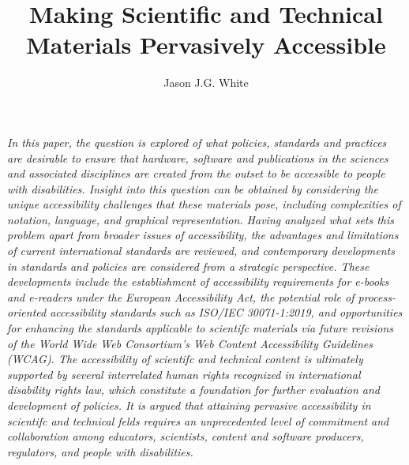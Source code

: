 \documentclass{sig-alternate} %
\makeatletter
\let\oldabstract\abstract
\let\oldendabstract\endabstract
\renewenvironment{abstract} %
{\renewenvironment{quotation}%
               {\list{}{\addtolength{\leftmargin}{1em} %
                        \listparindent 1.5em%
                        \itemindent    \listparindent%
                        \rightmargin   \leftmargin%
                        \parsep        \z@ \@plus\p@}%
                \item\relax}%
               {\endlist}%
\oldabstract}
{\oldendabstract}
\makeatother
\begin{document}
\title{Making Scientific and Technical Materials Pervasively Accessible}

\author[1]{\large \color{blue}Jason J.G. White}


\toappear{}
\maketitle
\begin{@twocolumnfalse} 
\begin{abstract}
\item 
 \textit {In this paper, the question is explored of what policies, standards and practices are desirable to ensure that hardware, software and publications in the sciences and associated disciplines are created from the outset to be accessible to people with disabilities. Insight into this question can be obtained by considering the unique accessibility challenges that these materials pose, including complexities of notation, language, and graphical representation. Having analyzed what sets this problem apart from broader issues of accessibility, the advantages and limitations of current international standards are reviewed, and contemporary developments in standards and policies are considered from a strategic perspective. These developments include the establishment of accessibility requirements for e-books and e-readers under the European Accessibility Act, the potential role of process-oriented accessibility standards such as ISO/IEC 30071-1:2019, and opportunities for enhancing the standards applicable to scientifc materials via future revisions of the World Wide Web Consortium's Web Content Accessibility Guidelines (WCAG). The accessibility of scientifc and technical content is ultimately supported by several interrelated human rights recognized in international disability rights law, which constitute a foundation for further evaluation and development of policies. It is argued that attaining pervasive accessibility in scientifc and technical felds requires an unprecedented level of commitment and collaboration among educators, scientists, content and software producers, regulators, and people with disabilities.}
     \\
     \\
    
\end{abstract}
\end{@twocolumnfalse}
\end{document}
